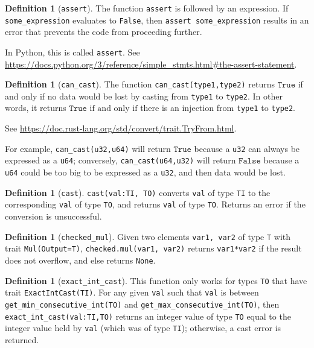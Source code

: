 \documentclass[11pt,a4paper]{article}
\theoremstyle{definition}
\newtheorem{definition}[theorem]{Definition}
\newcommand{\True}{\texttt{True}}
\newcommand{\False}{\texttt{False}}
\newcommand{\inRust}[2]{See \url{#2}.}
\newcommand{\inPython}[2]{In Python, this is called \texttt{#1}. See \url{#2}.}
\newcommand{\iffText}{\text{if and only if}}
\begin{document}
\begin{definition}[\texttt{assert}] 
    The function \texttt{assert} is followed by an expression. If \texttt{some\_expression} evaluates to \texttt{False}, then \texttt{assert some\_expression} results in an error that prevents the code from proceeding further. 
    
    \inPython{\texttt{assert}}{https://docs.python.org/3/reference/simple_stmts.html\#the-assert-statement}
\end{definition}

\begin{definition}[\texttt{can\_cast}]
    The function \texttt{can\_cast(type1,type2)} returns $\True$ if and only if no data would be lost by casting from \texttt{type1} to \texttt{type2}. In other words, it returns $\True$ $\iffText$ there is an injection from \texttt{type1} to \texttt{type2}. 
    
    \inRust{std::convert::TryFrom}{https://doc.rust-lang.org/std/convert/trait.TryFrom.html}
\end{definition}

For example, \texttt{can\_cast(u32,u64)} will return $\True$ because a \texttt{u32} can always be expressed as a \texttt{u64}; conversely, \texttt{can\_cast(u64,u32)} will return $\False$ because a \texttt{u64} could be too big to be expressed as a \texttt{u32}, and then data would be lost.

\begin{definition}[\texttt{cast}]
    \texttt{cast(val:TI, TO)} converts \texttt{val} of type \texttt{TI} to the corresponding \texttt{val} of type \texttt{TO}, and returns \texttt{val} of type \texttt{TO}. Returns an error if the conversion is unsuccessful.
\end{definition}

\begin{definition}[\texttt{checked\_mul}]
     Given two elements \texttt{var1, var2} of type \texttt{T} with trait \texttt{Mul(Output=T)}, \texttt{checked.mul(var1, var2)} returns \texttt{var1*var2} if the result does not overflow, and else returns \texttt{None}.
\end{definition}


\begin{definition}[\texttt{exact\_int\_cast}]
    This function only works for types \texttt{TO} that have trait \texttt{ExactIntCast(TI)}. For any given \texttt{val} such that \texttt{val} is between \texttt{get\_min\_consecutive\_int(TO)} and \texttt{get\_max\_consecutive\_int(TO)}, then \texttt{exact\_int\_cast(val:TI,TO)} returns an integer value of type \texttt{TO} equal to the integer value held by  \texttt{val} (which was of type \texttt{TI}); otherwise, a cast error is returned.
\end{definition}
\end{document}
